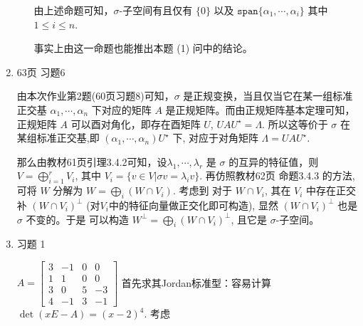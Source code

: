 \documentclass{article}
\begin{document}
\begin{spacing}{1.5}
\begin{enumerate}
\begin{itemize}
        由上述命题可知，$\sigma$-子空间有且仅有 $\{0\}$ 以及 $\mathtt{span}\{\alpha_1,\cdots,\alpha_i\}$ 其中 $1\leq i\leq n$.

        事实上由这一命题也能推出本题 (1) 问中的结论。
    \end{itemize}
    
    \item [5.] 63页 习题6
    
    由本次作业第2题(60页习题8)可知，$\sigma$ 是正规变换，当且仅当它在某一组标准正交基 $\alpha_1, \cdots, \alpha_n$ 下对应的矩阵 $A$ 是正规矩阵。而由正规矩阵基本定理可知，正规矩阵 $A$ 可以酉对角化，即存在酉矩阵 $U$, $UAU^\star = \Lambda$. 所以这等价于 $\sigma$ 在某组标准正交基,即 $(\alpha_1, \cdots, \alpha_n)U^\star$ 下, 对应于对角矩阵 $\Lambda = UAU^\star$.

    那么由教材61页引理3.4.2可知，设$\lambda_1, \cdots, \lambda_r$ 是 $\sigma$ 的互异的特征值，则 $V = \bigoplus_{i=1}^r V_i$, 其中 $V_i = \{v\in V| \sigma v = \lambda_i v\}$. 再仿照教材62页 命题3.4.3 的方法, 可将 $W$ 分解为 $W = \bigoplus_i (W\cap V_i)$. 考虑到 对于 $W\cap V_i$, 其在 $V_i$ 中存在正交补 $(W\cap V_i)^\perp$ (对$V_i$中的特征向量做正交化即可构造), 显然 $(W\cap V_i)^\perp$ 也是 $\sigma$ 不变的。于是 可以构造 $W^\perp = \bigoplus_i (W\cap V_i)^\perp$, 且它是 $\sigma$-子空间。

    \item [1.] 习题 1
    
    $A = \left[\begin{array}{cccc}3&-1&0&0\\1&1&0&0\\3&0&5&-3\\4&-1&3&-1\end{array}\right]$ 首先求其Jordan标准型：容易计算 $\det(xE-A) = (x-2)^4$. 考虑 
    

\end{enumerate}
\end{spacing}
\end{document}
